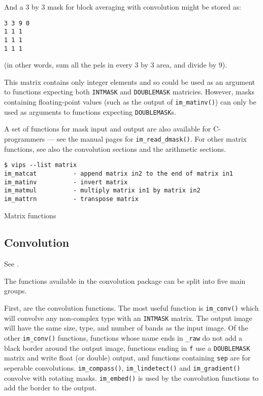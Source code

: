 And a 3 by 3 mask for block averaging with convolution might be stored as:

\begin{verbatim}
3 3 9 0
1 1 1
1 1 1 
1 1 1
\end{verbatim}
  
\noindent
(in other words, sum all the pels in every 3 by 3 area, and divide by 9).

This matrix contains only integer elements and so could be used as an
argument to functions expecting both \verb+INTMASK+ and \verb+DOUBLEMASK+
matricies. However, masks containing floating-point values (such as the
output of \verb+im_matinv()+) can only be used as arguments to functions
expecting \verb+DOUBLEMASK+s.

A set of functions for mask input and output are also available for
C-programmers --- see the manual pages for \verb+im_read_dmask()+. For
other matrix functions, see also the convolution sections and the arithmetic
sections.

\begin{fig2}
\begin{verbatim}
$ vips --list matrix
im_matcat          - append matrix in2 to the end of matrix in1
im_matinv          - invert matrix
im_matmul          - multiply matrix in1 by matrix in2
im_mattrn          - transpose matrix
\end{verbatim}
\caption{Matrix functions}
\label{fg:matricies}
\end{fig2}

\subsection{Convolution}

See .

The functions available in the convolution package can be split into five
main groups.

First, are the convolution functions. The most useful function is
\verb+im_conv()+ which will convolve any non-complex type with an
\verb+INTMASK+ matrix. The output image will have the same size, type, and
number of bands as the input image. Of the other \verb+im_conv()+ functions,
functions whose name ends in \verb+_raw+ do not add a black border around the
output image, functions ending in \verb+f+ use a \verb+DOUBLEMASK+ matrix
and write float (or double) output, and functions containing \verb+sep+
are for seperable convolutions.  \verb+im_compass()+, \verb+im_lindetect()+
and \verb+im_gradient()+ convolve with rotating masks.  \verb+im_embed()+
is used by the convolution functions to add the border to the output.

